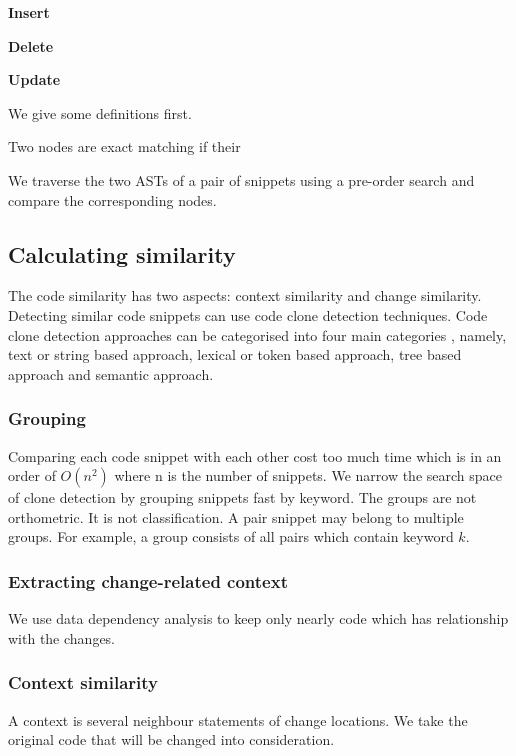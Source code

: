 \documentclass{sig-alternate-05-2015}
\begin{document}
\textbf{Insert}

\textbf{Delete}

\textbf{Update}

We give some definitions first.

\begin{def1}
Two nodes are exact matching if their 
\end{def1}

We traverse the two ASTs of a pair of snippets using a pre-order search and compare the corresponding nodes.


\subsection{Calculating similarity}
The code similarity has two aspects: context similarity and change similarity. Detecting similar code snippets can use code clone detection techniques. Code clone detection approaches can be categorised into four main categories \cite{DBLP:journals/corr/Onuoha16}, namely, text or string based approach, lexical or token based approach, tree based approach and semantic approach.

\subsubsection{Grouping}
Comparing each code snippet with each other cost too much time which is in an order of \begin{math}O(n^2) \end{math} where n is the number of snippets. We narrow the search space of clone detection by grouping snippets fast by keyword. The groups are not orthometric. It is not classification. A pair snippet may belong to multiple groups. For example, a group consists of all pairs which contain keyword $k$.

\subsubsection{Extracting change-related context}
We use data dependency analysis to keep only nearly code which has relationship with the changes.

\subsubsection{Context similarity}
A context is several neighbour statements of change locations. We take the original code that will be changed into consideration.  
 
\end{document}

